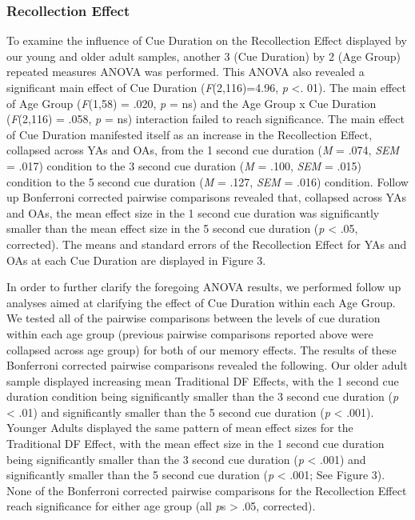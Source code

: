 \documentclass[man]{apa6}\usepackage[]{graphicx}\usepackage[]{color}
\begin{document}
\subsubsection*{Recollection Effect}

To examine the influence of Cue Duration on the Recollection Effect displayed by our young and older adult samples, another 3 (Cue Duration) by 2 (Age Group) repeated measures ANOVA was performed. This ANOVA also revealed a significant main effect of Cue Duration (\textit{F}(2,116)=4.96, \textit{p} <. 01). The main effect of Age Group (\textit{F}(1,58) = .020, \textit{p} = ns) and the Age Group x Cue Duration (\textit{F}(2,116) = .058, \textit{p} = ns) interaction failed to reach significance. The main effect of Cue Duration manifested itself as an increase in the Recollection Effect, collapsed across YAs and OAs, from the 1 second cue duration (\textit{M} = .074, \textit{SEM} = .017) condition to the 3 second cue duration (\textit{M} = .100, \textit{SEM} = .015) condition to the 5 second cue duration (\textit{M} = .127, \textit{SEM} = .016) condition. Follow up Bonferroni corrected pairwise comparisons revealed that, collapsed across YAs and OAs, the mean effect size in the 1 second cue duration was significantly smaller than the mean effect size in the 5 second cue duration (\textit{p} < .05, corrected). The means and standard errors of the Recollection Effect for YAs and OAs at each Cue Duration are displayed in Figure 3.

In order to further clarify the foregoing ANOVA results, we performed follow up analyses aimed at clarifying the effect of Cue Duration within each Age Group. We tested all of the pairwise comparisons between the levels of cue duration within each age group (previous pairwise comparisons reported above were collapsed across age group) for both of our memory effects. The results of these Bonferroni corrected pairwise comparisons revealed the following. Our older adult sample displayed increasing mean Traditional DF Effects, with the 1 second cue duration condition being significantly smaller than the 3 second cue duration (\textit{p} < .01) and significantly smaller than the 5 second cue duration (\textit{p} < .001). Younger Adults displayed the same pattern of mean effect sizes for the Traditional DF Effect, with the mean effect size in the 1 second cue duration being significantly smaller than the 3 second cue duration (\textit{p} < .001) and significantly smaller than the 5 second cue duration (\textit{p} < .001; See Figure 3). None of the Bonferroni corrected pairwise comparisons for the Recollection Effect reach significance for either age group (all \textit{p}s > .05, corrected).
\end{document}
